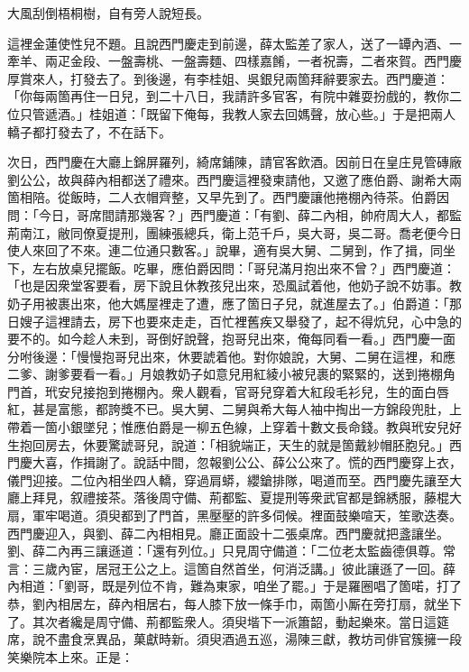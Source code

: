 \begin{myquote}
大風刮倒梧桐樹，自有旁人說短長。
\end{myquote}

這裡金蓮使性兒不題。且說西門慶走到前邊，薛太監差了家人，送了一罈內酒、一牽羊、兩疋金段、一盤壽桃、一盤壽麵、四樣嘉餚，一者祝壽，二者來賀。西門慶厚賞來人，打發去了。到後邊，有李桂姐、吳銀兒兩箇拜辭要家去。西門慶道：「你每兩箇再住一日兒，到二十八日，我請許多官客，有院中雜耍扮戲的，教你二位只管遞酒。」桂姐道：「既留下俺每，我教人家去回媽聲，放心些。」于是把兩人轎子都打發去了，不在話下。

次日，西門慶在大廳上錦屏羅列，綺席鋪陳，請官客飲酒。因前日在皇庄見管磚廠劉公公，故與薛內相都送了禮來。西門慶這裡發柬請他，又邀了應伯爵、謝希大兩箇相陪。從飯時，二人衣帽齊整，又早先到了。西門慶讓他捲棚內待茶。伯爵因問：「今日，哥席間請那幾客？」西門慶道：「有劉、薛二內相，帥府周大人，都監荊南江，敝同僚夏提刑，團練張總兵，衛上范千戶，吳大哥，吳二哥。喬老便今日使人來回了不來。連二位通只數客。」說畢，適有吳大舅、二舅到，作了揖，同坐下，左右放桌兒擺飯。吃畢，應伯爵因問：「哥兒滿月抱出來不曾？」西門慶道：「也是因衆堂客要看，房下說且休教孩兒出來，恐風試着他，他奶子說不妨事。教奶子用被裹出來，他大媽屋裡走了遭，應了箇日子兒，就進屋去了。」伯爵道：「那日嫂子這裡請去，房下也要來走走，百忙裡舊疾又舉發了，起不得炕兒，心中急的要不的。如今趁人未到，哥倒好說聲，抱哥兒出來，俺每同看一看。」西門慶一面分咐後邊：「慢慢抱哥兒出來，休要諕着他。對你娘說，大舅、二舅在這裡，和應二爹、謝爹要看一看。」月娘教奶子如意兒用紅綾小被兒裹的緊緊的，送到捲棚角門首，玳安兒接抱到捲棚內。衆人觀看，官哥兒穿着大紅段毛衫兒，生的面白唇紅，甚是富態，都誇獎不已。吳大舅、二舅與希大每人袖中掏出一方錦段兜肚，上帶着一箇小銀墜兒；惟應伯爵是一柳五色線，上穿着十數文長命錢。教與玳安兒好生抱回房去，休要驚諕哥兒，說道：「相貌端正，天生的就是箇戴紗帽胚胞兒。」{}西門慶大喜，作揖謝了。說話中間，忽報劉公公、薛公公來了。慌的西門慶穿上衣，儀門迎接。二位內相坐四人轎，穿過肩蟒，纓鎗排隊，喝道而至。西門慶先讓至大廳上拜見，叙禮接茶。落後周守備、荊都監、夏提刑等衆武官都是錦綉服，藤棍大扇，軍牢喝道。須臾都到了門首，黑壓壓的許多伺候。裡面鼓樂喧天，笙歌迭奏。西門慶迎入，與劉、薛二內相相見。廳正面設十二張桌席。西門慶就把盞讓坐。劉、薛二內再三讓遜道：「還有列位。」只見周守備道：「二位老太監齒德俱尊。常言：三歲內宦，居冠王公之上。這箇自然首坐，何消泛講。」彼此讓遜了一回。薛內相道：「劉哥，既是列位不肯，難為東家，咱坐了罷。」于是羅圈唱了箇喏，打了恭，劉內相居左，薛內相居右，每人膝下放一條手巾，兩箇小厮在旁打扇，就坐下了。其次者纔是周守備、荊都監衆人。須臾堦下一派簫韶，動起樂來。當日這筵席，說不盡食烹異品，菓獻時新。須臾酒過五巡，湯陳三獻，教坊司俳官簇擁一段笑樂院本上來。正是：


